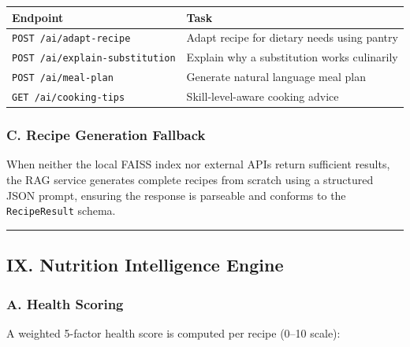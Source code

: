 \documentclass[10pt,conference,compsoc]{IEEEtran}
\begin{document}
\begin{longtable}[]{@{}
  >{\raggedright\arraybackslash}p{}
  >{\raggedright\arraybackslash}p{}@{}}
\toprule\noalign{}
\begin{minipage}[b]{\linewidth}\raggedright
Endpoint
\end{minipage} & \begin{minipage}[b]{\linewidth}\raggedright
Task
\end{minipage} \\
\midrule\noalign{}
\endhead
\bottomrule\noalign{}
\endlastfoot
\texttt{POST\ /ai/adapt-recipe} & Adapt recipe for dietary needs using
pantry \\
\texttt{POST\ /ai/explain-substitution} & Explain why a substitution
works culinarily \\
\texttt{POST\ /ai/meal-plan} & Generate natural language meal plan \\
\texttt{GET\ /ai/cooking-tips} & Skill-level-aware cooking advice \\
\end{longtable}

\subsubsection{C. Recipe Generation
Fallback}\label{c.-recipe-generation-fallback}

When neither the local FAISS index nor external APIs return sufficient
results, the RAG service generates complete recipes from scratch using a
structured JSON prompt, ensuring the response is parseable and conforms
to the \texttt{RecipeResult} schema.

\begin{center}\rule{0.5\linewidth}{0.5pt}\end{center}

\subsection{IX. Nutrition Intelligence
Engine}\label{ix.-nutrition-intelligence-engine}

\subsubsection{A. Health Scoring}\label{a.-health-scoring}

A weighted 5-factor health score is computed per recipe (0--10 scale):
\end{document}
